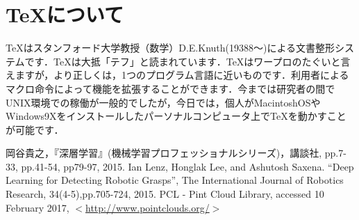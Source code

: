 \documentclass[twocolumn,10pt]{jarticle}
\begin{document}
\section{\TeX について}
TeXはスタンフォード大学教授（数学）D.E.Knuth(19388～)による文書整形システムです．TeXは大抵「テフ」と読まれています．TeXはワープロのたぐいと言えますが，より正しくは，1つのプログラム言語に近いものです．利用者によるマクロ命令によって機能を拡張することができます．今までは研究者の間でUNIX環境での稼働が一般的でしたが，今日では，個人がMacintoshOSやWindows9Xをインストールしたパーソナルコンピュータ上でTeXを動かすことが可能です．
\begin{thebibliography}{99}
 岡谷貴之，『深層学習』(機械学習プロフェッショナルシリーズ)，講談社, pp.7-33, pp.41-54, pp79-97, 2015.
 Ian Lenz, Honglak Lee,
 and Ashutosh Saxena.
 ``Deep Learning for Detecting Robotic Grasps'',
 The International Journal of Robotics Research,
 34(4-5),pp.705-724, 2015.
 PCL - Pint Cloud Library, accessed
 10 February 2017, $<$\url{http://www.pointclouds.org/}$>$
\end{thebibliography}
\end{document}
